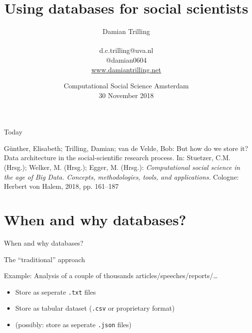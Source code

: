 \documentclass{beamer}
\begin{document}
\title{Using databases for social scientists}
\author[Damian Trilling]{Damian Trilling \\ ~ \\ \footnotesize{d.c.trilling@uva.nl \\@damian0604} \\ \url{www.damiantrilling.net}}
\date[30-11-2018]{Computational Social Science Amsterdam\\ 30 November 2018}


\begin{frame}{}
\titlepage
\end{frame}

\begin{frame}{Today}
\tableofcontents
\end{frame}

\begin{frame}[plain]
G\"unther, Elisabeth; Trilling, Damian; van de Velde, Bob: But how do we store it?
Data architecture in the social-scientific research process. In: Stuetzer, C.M. (Hrsg.);
Welker, M. (Hrsg.); Egger, M. (Hrsg.): \textit{Computational social science in the age of
Big Data. Concepts, methodologies, tools, and applications.} Cologne: Herbert von Halem, 2018, pp. 161–187	

\end{frame}


\section{When and why databases?}


\begin{frame}[plain]
	When and why databases?
\end{frame}


\begin{frame}{The ``traditional'' approach}
	\begin{block}{Example: Analysis of a couple of thousands articles/speeches/reports/\ldots}
		\begin{itemize}
			\item<2-> Store as seperate \texttt{.txt} files
		\end{itemize}
		\begin{itemize}
			\item<3-> Store as tabular dataset (\texttt{.csv} or proprietary format)
			\item<4-> (possibly: store as seperate \texttt{.json} files)
		\end{itemize}
	\end{block}
\end{frame}
\end{document}

